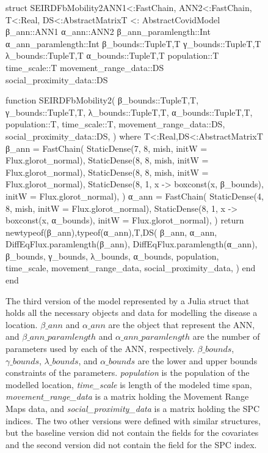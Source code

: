 \begin{figure}[!htb]
\centering
\begin{jllisting}
struct SEIRDFbMobility2{ANN1<:FastChain,
                        ANN2<:FastChain,
                        T<:Real,
                        DS<:AbstractMatrix{T}} <: AbstractCovidModel
    β_ann::ANN1
    α_ann::ANN2
    β_ann_paramlength::Int
    α_ann_paramlength::Int
    β_bounds::Tuple{T,T}
    γ_bounds::Tuple{T,T}
    λ_bounds::Tuple{T,T}
    α_bounds::Tuple{T,T}
    population::T
    time_scale::T
    movement_range_data::DS
    social_proximity_data::DS

    function SEIRDFbMobility2(
        β_bounds::Tuple{T,T},
        γ_bounds::Tuple{T,T},
        λ_bounds::Tuple{T,T},
        α_bounds::Tuple{T,T},
        population::T,
        time_scale::T,
        movement_range_data::DS,
        social_proximity_data::DS,
    ) where {T<:Real,DS<:AbstractMatrix{T}}
        β_ann = FastChain(
            StaticDense(7, 8, mish, initW = Flux.glorot_normal),
            StaticDense(8, 8, mish, initW = Flux.glorot_normal),
            StaticDense(8, 8, mish, initW = Flux.glorot_normal),
            StaticDense(8, 1,
                        x -> boxconst(x, β_bounds),
                        initW = Flux.glorot_normal),
        )
        α_ann = FastChain(
            StaticDense(4, 8, mish, initW = Flux.glorot_normal),
            StaticDense(8, 1,
                        x -> boxconst(x, α_bounds),
                        initW = Flux.glorot_normal),
        )
        return new{typeof(β_ann),typeof(α_ann),T,DS}(
            β_ann, α_ann,
            DiffEqFlux.paramlength(β_ann),
            DiffEqFlux.paramlength(α_ann),
            β_bounds, γ_bounds, λ_bounds, α_bounds,
            population, time_scale,
            movement_range_data,
            social_proximity_data,
        )
    end
end
\end{jllisting}
\caption[Julia implementation of a struct representing the model third version]{The third version of the model represented by a Julia struct that holds all the necessary objects and data for modelling the disease a location. \textit{$\beta\_ann$} and \textit{$\alpha\_ann$} are the object that represent the ANN, and \textit{$\beta\_ann\_paramlength$} and \textit{$\alpha\_ann\_paramlength$} are the number of parameters used by each of the ANN, respectively. \textit{$\beta\_bounds$}, \textit{$\gamma\_bounds$}, \textit{$\lambda\_bounds$}, and \textit{$\alpha\_bounds$} are the lower and upper bounds constraints of the parameters. \textit{population} is the population of the modelled location, \textit{time\_scale} is length of the modeled time span, \textit{movement\_range\_data} is a matrix holding the Movement Range Maps data, and \textit{social\_proximity\_data} is a matrix holding the SPC indices. The two other versions were defined with similar structures, but the baseline version did not contain the fields for the covariates and the second version did not contain the field for the SPC index.}
\label{fig:diffeq-seird-fb2-struct}
\end{figure}

